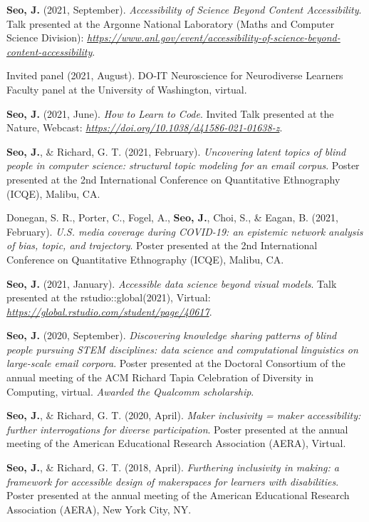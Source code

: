 \documentclass[11pt,a4paper,]{awesome-cv}
\begin{document}
\textbf{Seo, J.} (2021, September). \emph{Accessibility of Science
Beyond Content Accessibility}. Talk presented at the Argonne National
Laboratory (Maths and Computer Science Division):
\emph{\url{https://www.anl.gov/event/accessibility-of-science-beyond-content-accessibility}}.

Invited panel (2021, August). DO-IT Neuroscience for Neurodiverse
Learners Faculty panel at the University of Washington, virtual.

\textbf{Seo, J.} (2021, June). \emph{How to Learn to Code}. Invited Talk
presented at the Nature, Webcast:
\emph{\url{https://doi.org/10.1038/d41586-021-01638-z}}.

\textbf{Seo, J.}, \& Richard, G. T. (2021, February). \emph{Uncovering
latent topics of blind people in computer science: structural topic
modeling for an email corpus}. Poster presented at the 2nd International
Conference on Quantitative Ethnography (ICQE), Malibu, CA.

Donegan, S. R., Porter, C., Fogel, A., \textbf{Seo, J.}, Choi, S., \&
Eagan, B. (2021, February). \emph{U.S. media coverage during COVID-19:
an epistemic network analysis of bias, topic, and trajectory}. Poster
presented at the 2nd International Conference on Quantitative
Ethnography (ICQE), Malibu, CA.

\textbf{Seo, J.} (2021, January). \emph{Accessible data science beyond
visual models}. Talk presented at the rstudio::global(2021), Virtual:
\emph{\url{https://global.rstudio.com/student/page/40617}}.

\textbf{Seo, J.} (2020, September). \emph{Discovering knowledge sharing
patterns of blind people pursuing STEM disciplines: data science and
computational linguistics on large-scale email corpora}. Poster
presented at the Doctoral Consortium of the annual meeting of the ACM
Richard Tapia Celebration of Diversity in Computing, virtual.
\emph{Awarded the Qualcomm scholarship}.

\textbf{Seo, J.}, \& Richard, G. T. (2020, April). \emph{Maker
inclusivity = maker accessibility: further interrogations for diverse
participation}. Poster presented at the annual meeting of the American
Educational Research Association (AERA), Virtual.

\textbf{Seo, J.}, \& Richard, G. T. (2018, April). \emph{Furthering
inclusivity in making: a framework for accessible design of makerspaces
for learners with disabilities}. Poster presented at the annual meeting
of the American Educational Research Association (AERA), New York City,
NY.
\end{document}
